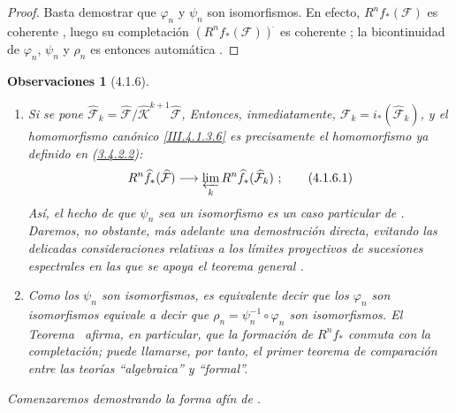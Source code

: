 \documentclass[10pt,oneside,openany]{book}
\theoremstyle{egaenv}\newtheorem*{env}{---}
\theoremstyle{egastatement}
\theoremstyle{egadescription}
\newtheorem*{remarks}{Observaciones}
\begin{document}
\begin{proof}
Basta demostrar que $\varphi_n$ y $\psi_n$ son isomorfismos.
En efecto, $R^nf_*(\mathcal F)$ es coherente , luego
su completación $(R^nf_*(\mathcal F))^{\widehat{\,}}$ es coherente
; la bicontinuidad de $\varphi_n$, $\psi_n$ y
$\rho_n$ es entonces automática .
\end{proof}

\begin{remarks}[4.1.6]
\label{III.4.1.6-fr}
\upshape
\begin{enumerate}
\item[(i)] Si se pone $\widehat{\mathcal F}_k=
\widehat{\mathcal F}/\widehat{\mathcal K}^{k+1}
\widehat{\mathcal F}$,
  Entonces, inmediatamente,
  $\mathcal F_k=i_*(\widehat{\mathcal F}_k)$,
  y el homomorfismo canónico \eqref{III.4.1.3.6} es precisamente el
  homomorfismo ya definido en (\hyperref[III.3.4.2.2]{3.4.2.2}):
  \[
R^n\widehat f_*(\widehat{\mathcal F})
\longrightarrow\varprojlim_kR^n\widehat f_*(\widehat{\mathcal F}_k)~;
\tag{4.1.6.1}\label{III.4.1.6.1-fr}
\]
  Así, el hecho de que $\psi_n$ sea un isomorfismo es un caso particular
  de .
  Daremos, no obstante, más adelante una demostración directa, evitando
  las delicadas consideraciones relativas a los límites proyectivos de
  sucesiones espectrales  en las que se apoya el teorema
  general .

  \item[(ii)] Como los $\psi_n$ son isomorfismos, es equivalente decir que los $\varphi_n$ son isomorfismos equivale a decir que
  $\rho_n=\psi_n^{-1}\circ\varphi_n$
  son isomorfismos.
  El Teorema~ afirma, en particular, que \emph{la formación de}
  $R^nf_*$ \emph{conmuta con la completación}; puede llamarse, por tanto, el
  \emph{primer teorema de comparación} entre las teorías ``algebraica'' y
  ``formal''.
\end{enumerate}
Comenzaremos demostrando la forma afín de .
\end{remarks}
\end{document}
